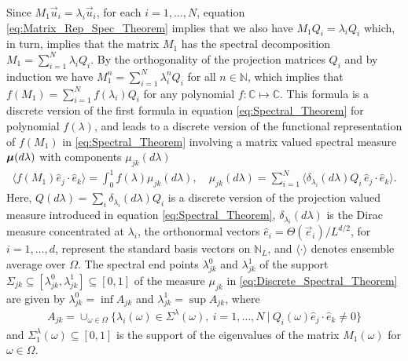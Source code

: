 \documentclass{cmslatex}
\newcommand\bmu{\mbox{\boldmath${\mu}$}}
\begin{document}
Since $M_1\vec{u}_i=\lambda_i\vec{u}_i$, for each $i=1,\ldots,N$, equation
\eqref{eq:Matrix_Rep_Spec_Theorem} implies that we also have
$M_1Q_i=\lambda_iQ_i$ which, in turn, implies that the matrix  $M_1$ has the
spectral decomposition $M_1=\sum_{i=1}^N\lambda_iQ_i$. By the orthogonality of
the projection matrices $Q_i$ and by induction we have
$M_1^n=\sum_{i=1}^N\lambda_i^nQ_i$ for all $n\in\mathbb{N}$, which implies that
$f(M_1)=\sum_{i=1}^Nf(\lambda_i)Q_i$ for any polynomial
$f:\mathbb{C}\mapsto\mathbb{C}$.  This formula is a discrete version of the
first formula in equation \eqref{eq:Spectral_Theorem} for polynomial
$f(\lambda)$, and leads to a discrete version of the functional
representation of  $f(M_1)$ in \eqref{eq:Spectral_Theorem} involving a
matrix valued spectral measure $\bmu(d\lambda)$ with components $\mu_{jk}(d\lambda)$
%
\begin{align}\label{eq:Discrete_Spectral_Theorem}
  \langle f(M_1)\hat{e}_j\cdot\hat{e}_k\rangle= \int_0^1f(\lambda)\mu_{jk}(d\lambda), \quad
  \mu_{jk}(d\lambda)=\sum_{i=1}^N\langle\delta_{\lambda_i}(d\lambda)Q_i\,\hat{e}_j\cdot\hat{e}_k\rangle.
\end{align}
%
Here, $Q(d\lambda)=\sum_i\delta_{\lambda_i}(d\lambda)Q_i$ is a discrete version of the
projection valued measure introduced in equation
\eqref{eq:Spectral_Theorem}, $\delta_{\lambda_i}(d\lambda)$ is the Dirac measure
concentrated at $\lambda_i$, the orthonormal vectors
$\hat{e}_i=\Theta(\vec{e}_i)/L^{d/2}$, for $i=1,\ldots,d$, represent the standard
basis vectors on $\mathbb{N}_L$, and $\langle\cdot\rangle$ denotes ensemble
average over $\Omega$. The spectral end points $\lambda_{jk}^0$ and $\lambda_{jk}^1$ of the
support $\Sigma_{jk}\subseteq[\lambda_{jk}^0,\lambda_{jk}^1]\subseteq[0,1]$ of the measure $\mu_{jk}$ in
\eqref{eq:Discrete_Spectral_Theorem} are given by
$\lambda_{jk}^0=\inf A_{jk}$ and $\lambda_{jk}^1=\sup A_{jk}$, where
%
\begin{align}
  A_{jk}= \cup_{\omega\in\Omega}\{\lambda_i(\omega)\in\Sigma^\lambda(\omega), \   i=1,\ldots,N \ | \ Q_i(\omega)\hat{e}_j\cdot\hat{e}_k\neq0\}
\end{align}
%
and $\Sigma^\lambda_1(\omega)\subseteq[0,1]$ is the support of the eigenvalues of the matrix
$M_1(\omega)$ for $\omega\in\Omega$. 
\end{document}

